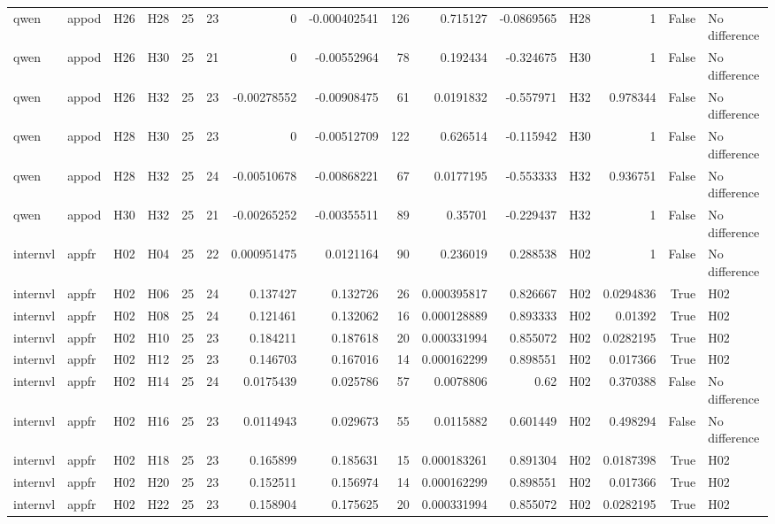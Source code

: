 \begin{longtable}{llllrrrrrrrlrrl}
qwen & appod & H26 & H28 & 25 & 23 & 0 & -0.000402541 & 126 & 0.715127 & -0.0869565 & H28 & 1 & False & No difference \\
qwen & appod & H26 & H30 & 25 & 21 & 0 & -0.00552964 & 78 & 0.192434 & -0.324675 & H30 & 1 & False & No difference \\
qwen & appod & H26 & H32 & 25 & 23 & -0.00278552 & -0.00908475 & 61 & 0.0191832 & -0.557971 & H32 & 0.978344 & False & No difference \\
qwen & appod & H28 & H30 & 25 & 23 & 0 & -0.00512709 & 122 & 0.626514 & -0.115942 & H30 & 1 & False & No difference \\
qwen & appod & H28 & H32 & 25 & 24 & -0.00510678 & -0.00868221 & 67 & 0.0177195 & -0.553333 & H32 & 0.936751 & False & No difference \\
qwen & appod & H30 & H32 & 25 & 21 & -0.00265252 & -0.00355511 & 89 & 0.35701 & -0.229437 & H32 & 1 & False & No difference \\
internvl & appfr & H02 & H04 & 25 & 22 & 0.000951475 & 0.0121164 & 90 & 0.236019 & 0.288538 & H02 & 1 & False & No difference \\
internvl & appfr & H02 & H06 & 25 & 24 & 0.137427 & 0.132726 & 26 & 0.000395817 & 0.826667 & H02 & 0.0294836 & True & H02 \\
internvl & appfr & H02 & H08 & 25 & 24 & 0.121461 & 0.132062 & 16 & 0.000128889 & 0.893333 & H02 & 0.01392 & True & H02 \\
internvl & appfr & H02 & H10 & 25 & 23 & 0.184211 & 0.187618 & 20 & 0.000331994 & 0.855072 & H02 & 0.0282195 & True & H02 \\
internvl & appfr & H02 & H12 & 25 & 23 & 0.146703 & 0.167016 & 14 & 0.000162299 & 0.898551 & H02 & 0.017366 & True & H02 \\
internvl & appfr & H02 & H14 & 25 & 24 & 0.0175439 & 0.025786 & 57 & 0.0078806 & 0.62 & H02 & 0.370388 & False & No difference \\
internvl & appfr & H02 & H16 & 25 & 23 & 0.0114943 & 0.029673 & 55 & 0.0115882 & 0.601449 & H02 & 0.498294 & False & No difference \\
internvl & appfr & H02 & H18 & 25 & 23 & 0.165899 & 0.185631 & 15 & 0.000183261 & 0.891304 & H02 & 0.0187398 & True & H02 \\
internvl & appfr & H02 & H20 & 25 & 23 & 0.152511 & 0.156974 & 14 & 0.000162299 & 0.898551 & H02 & 0.017366 & True & H02 \\
internvl & appfr & H02 & H22 & 25 & 23 & 0.158904 & 0.175625 & 20 & 0.000331994 & 0.855072 & H02 & 0.0282195 & True & H02 \\

\end{longtable}

